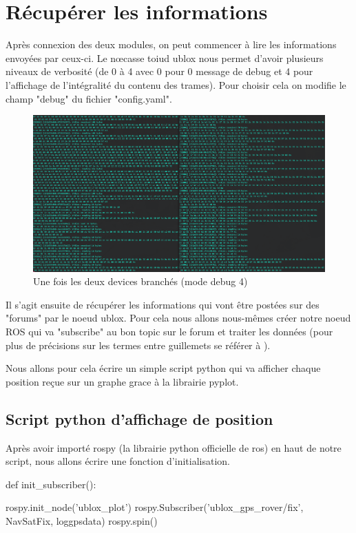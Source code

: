 \section{Récupérer les informations}

Après connexion des deux modules, on peut commencer à lire les informations envoyées par ceux-ci. Le n\oe{}casse toiud ublox nous permet d'avoir plusieurs niveaux de verbosité (de 0 à 4 avec 0 pour 0 message de debug et 4 pour l'affichage de l'intégralité du contenu des trames). Pour choisir cela on modifie le champ "debug" du fichier "config.yaml".

\begin{figure}[!htbp]
\begin{center}
	\includegraphics[width=\textwidth]{img/ros_node.png}
\end{center}
    \caption{Une fois les deux devices branchés (mode debug 4)}
\end{figure}

Il s'agit ensuite de récupérer les informations qui vont être postées sur des "forums" par le noeud ublox. Pour cela nous allons nous-mêmes créer notre noeud ROS qui va "subscribe" au bon topic sur le forum et traiter les données (pour plus de précisions sur les termes entre guillemets se référer à \cite{NOM06}).

Nous allons pour cela écrire un simple script python qui va afficher chaque position reçue sur un graphe grace à la librairie pyplot.
\vspace{3cm}
\subsection{Script python d'affichage de position}

Après avoir importé rospy (la librairie python officielle de ros) en haut de notre script, nous allons écrire une fonction d'initialisation.
\vspace{0.5cm}
\begin{python}
def init_subscriber():

  rospy.init_node('ublox_plot')
  rospy.Subscriber('ublox_gps_rover/fix', NavSatFix, loggpsdata)
  rospy.spin()

\end{python}

